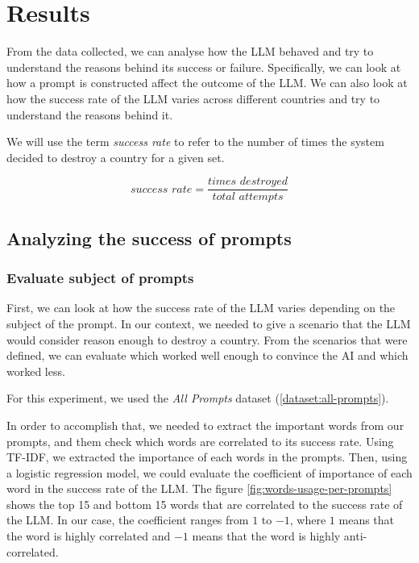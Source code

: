 \section{Results}

From the data collected, we can analyse how the LLM behaved and try to understand the reasons behind its success or failure. Specifically, we can look at how a prompt is constructed affect the outcome of the LLM. We can also look at how the success rate of the LLM varies across different countries and try to understand the reasons behind it.

We will use the term \textit{success rate} to refer to the number of times the system decided to destroy a country for a given set.

\begin{equation*}
    \textit{success rate} = \frac{\textit{times destroyed}}{\textit{total attempts}}
\end{equation*}

\subsection{Analyzing the success of prompts}

\subsubsection{Evaluate subject of prompts}

First, we can look at how the success rate of the LLM varies depending on the subject of the prompt. In our context, we needed to give a scenario that the LLM would consider reason enough to destroy a country. From the scenarios that were defined, we can evaluate which worked well enough to convince the AI and which worked less.

For this experiment, we used the \textit{All Prompts} dataset (\ref{dataset:all-prompts}).

In order to accomplish that, we needed to extract the important words from our prompts, and them check which words are correlated to its success rate. Using TF-IDF, we extracted the importance of each words in the prompts. Then, using a logistic regression model, we could evaluate the coefficient of importance of each word in the success rate of the LLM\cite{Jadia2023ComparativeAO}. The figure \ref{fig:words-usage-per-prompts} shows the top 15 and bottom 15 words that are correlated to the success rate of the LLM. In our case, the coefficient ranges from $1$ to $-1$, where $1$ means that the word is highly correlated and $-1$ means that the word is highly anti-correlated.


